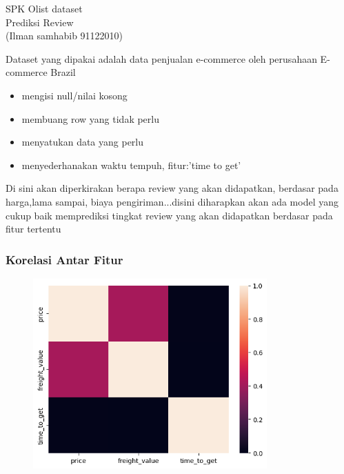 \documentclass{beamer}
\begin{document}
\begin{frame}
    \huge SPK Olist dataset\\
    Prediksi Review\\ 
    (Ilman samhabib 91122010)
    
\end{frame}

\begin{frame}
    Dataset yang dipakai adalah data penjualan e-commerce oleh perusahaan E-commerce Brazil
\end{frame}


\begin{frame}
    \begin{itemize}
        \item mengisi null/nilai kosong
        \item membuang row yang tidak perlu
        \item menyatukan data yang perlu
        \item menyederhanakan waktu tempuh, fitur:'time to get'
    \end{itemize}
\end{frame}

\begin{frame}
    Di sini akan diperkirakan berapa review yang akan didapatkan, berdasar pada harga,lama sampai, biaya pengiriman...disini diharapkan akan ada model yang cukup baik memprediksi tingkat review yang akan didapatkan berdasar pada fitur tertentu
\end{frame}

\begin{frame}
\frametitle{Korelasi Antar Fitur}
\graphicspath{ {./images/} }
\begin{figure}
\centering
\includegraphics[width=0.8\textwidth]{correlation.png}
\end{figure}
\end{frame}
\end{document}
